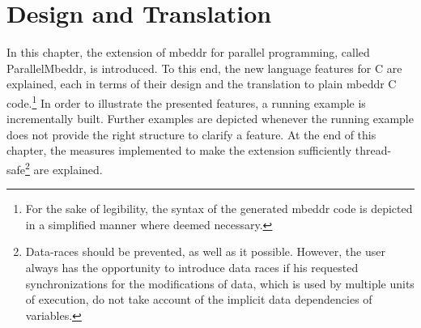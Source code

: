 \chapter{Design and Translation}
In this chapter, the extension of mbeddr for parallel programming, called ParallelMbeddr, is introduced. To this end, the new language features for C are explained, each in terms of their design and the translation to plain mbeddr C code.\footnote{For the sake of legibility, the syntax of the generated mbeddr code is depicted in a simplified manner where deemed necessary.} In order to illustrate the presented features, a running example is incrementally built. Further examples are depicted whenever the running example does not provide the right structure to clarify a feature. At the end of this chapter, the measures implemented to make the extension sufficiently thread-safe\footnote{Data-races should be prevented, as well as it possible. However, the user always has the opportunity to introduce data races if his requested synchronizations for the modifications of data, which is used by multiple units of execution, do not take account of the implicit data dependencies of variables.} are explained.





